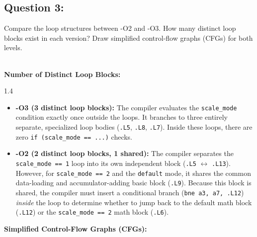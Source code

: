 \documentclass[12pt, a4paper]{article}
\begin{document}
\subsection*{Question 3:}

\vspace{0.3cm}
Compare the loop structures between -O2 and -O3. How many distinct loop blocks exist in each version? Draw simplified control-flow graphs (CFGs) for both levels.

\vspace{0.3cm}
\noindent{}\\
\textbf{Number of Distinct Loop Blocks:}
\begin{spacing}{1.4}
\begin{itemize}[leftmargin=*]
    \item \textbf{-O3 (3 distinct loop blocks):} The compiler evaluates the \texttt{scale\_mode} condition exactly once outside the loops. It branches to three entirely separate, specialized loop bodies (\texttt{.L5}, \texttt{.L8}, \texttt{.L7}). Inside these loops, there are zero \texttt{if (scale\_mode == ...)} checks.
    \item \textbf{-O2 (2 distinct loop blocks, 1 shared):} The compiler separates the \texttt{scale\_mode == 1} loop into its own independent block (\texttt{.L5} $\leftrightarrow$ \texttt{.L13}). However, for \texttt{scale\_mode == 2} and the \texttt{default} mode, it shares the common data-loading and accumulator-adding basic block (\texttt{.L9}). Because this block is shared, the compiler must insert a conditional branch (\texttt{bne a3, a7, .L12}) \textit{inside} the loop to determine whether to jump back to the default math block (\texttt{.L12}) or the \texttt{scale\_mode == 2} math block (\texttt{.L6}).
\end{itemize}
\end{spacing}

\noindent
\textbf{Simplified Control-Flow Graphs (CFGs):}
\end{document}
